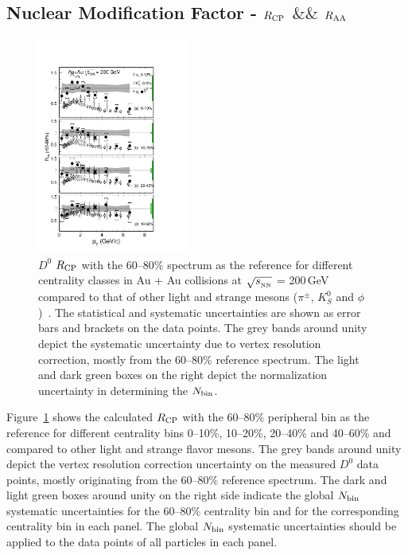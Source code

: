 \documentclass[%
 reprint,	
 amsmath,amssymb,
 aps,
 prc,
]{revtex4-1}
\begin{document}
\subsection{\label{result:RCP}Nuclear Modification Factor - $R_{\rm CP}$ $\&\&$  $R_{\rm AA}$}

\begin{figure}
\centering
\includegraphics[width=0.45\textwidth]{fig/D0_Rcp1.pdf}
\caption{$D^{0}$ $R_{\rm CP}$ with the 60--80\% spectrum as the reference for different centrality classes in Au + Au collisions at $\sqrt{s_{_{\rm NN}}}$ = 200\,GeV compared to that of other light and strange mesons ($\pi^{\pm}$, $K^0_{S}$ and $\phi$)~\cite{Adams2006_Identified,Abelev2009,Agakishiev2012}. The statistical and systematic uncertainties are shown as error bars and brackets on the data points. The grey bands around unity depict the systematic uncertainty due to vertex resolution correction, mostly from the 60--80\% reference spectrum. The light and dark green boxes on the right depict the normalization uncertainty in determining the $N_{\rm bin}$.}
\label{fig:D0_Rcp} 
\end{figure}

Figure~\ref{fig:D0_Rcp} shows the calculated $R_{\rm CP}$ with the 60--80\% peripheral bin as the reference for different centrality bins 0--10\%, 10--20\%, 20--40\% and 40--60\% and compared to other light and strange flavor mesons. The grey bands around unity depict the vertex resolution correction uncertainty on the measured $D^0$ data points, mostly originating from the 60--80\% reference spectrum. The dark and light green boxes around unity on the right side indicate the global $N_{\rm bin}$ systematic uncertainties for the 60--80\% centrality bin and for the corresponding centrality bin in each panel. The global $N_{\rm bin}$ systematic uncertainties should be applied to the data points of all particles in each panel.
\end{document}
